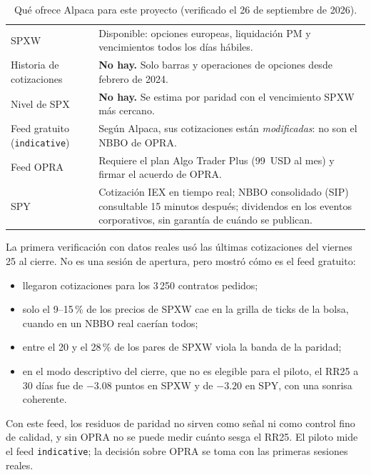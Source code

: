 \begin{table}[H]
\centering\small
\caption{Qué ofrece Alpaca para este proyecto (verificado el 26 de septiembre de 2026).}
\label{tab:alpaca}
\begin{tabularx}{\linewidth}{@{}>{\RaggedRight}p{3.6cm} Y@{}}
\toprule
{} & \\
\midrule
SPXW & Disponible: opciones europeas, liquidación PM y vencimientos todos los días hábiles.\\
Historia de cotizaciones & \textbf{No hay.} Solo barras y operaciones de opciones desde febrero de 2024.\\
Nivel de SPX & \textbf{No hay.} Se estima por paridad con el vencimiento SPXW más cercano.\\
Feed gratuito (\texttt{indicative}) & Según Alpaca, sus cotizaciones están \emph{modificadas}: no son el NBBO
de OPRA.\\
Feed OPRA & Requiere el plan Algo Trader Plus (99~USD al mes) y firmar el acuerdo de OPRA.\\
SPY & Cotización IEX en tiempo real; NBBO consolidado (SIP) consultable 15 minutos después; dividendos en los
eventos corporativos, sin garantía de cuándo se publican.\\
\bottomrule
\end{tabularx}
\end{table}

La primera verificación con datos reales usó las últimas cotizaciones del viernes 25 al cierre. No es una
sesión de apertura, pero mostró cómo es el feed gratuito:
\begin{itemize}
\item llegaron cotizaciones para los 3\,250 contratos pedidos;
\item solo el 9--15\,\% de los precios de SPXW cae en la grilla de ticks de la bolsa, cuando en un NBBO real
caerían todos;
\item entre el 20 y el 28\,\% de los pares de SPXW viola la banda de la paridad;
\item en el modo descriptivo del cierre, que no es elegible para el piloto, el RR25 a 30 días fue de
$-3.08$ puntos en SPXW y de $-3.20$ en SPY, con una sonrisa coherente.
\end{itemize}
Con este feed, los residuos de paridad no sirven como señal ni como control fino de calidad, y sin OPRA no se
puede medir cuánto sesga el RR25. El piloto mide el feed \texttt{indicative}; la decisión sobre OPRA se toma
con las primeras sesiones reales.

